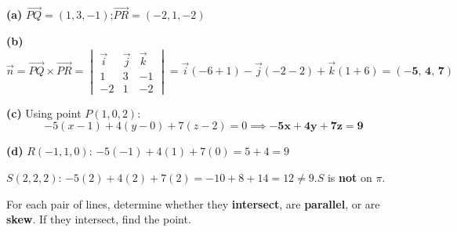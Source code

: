 \documentclass[addpoints]{exam}
\begin{document}
\begin{questions}
\begin{solution}[9cm]
\textbf{(a)} $\overrightarrow{PQ} = (1,3,-1)$;\quad $\overrightarrow{PR} = (-2,1,-2)$

\textbf{(b)}
\[
\vec{n} = \overrightarrow{PQ}\times\overrightarrow{PR} =
\begin{vmatrix}\vec{i}&\vec{j}&\vec{k}\\1&3&-1\\-2&1&-2\end{vmatrix}
= \vec{i}(-6+1) - \vec{j}(-2-2) + \vec{k}(1+6) = \mathbf{(-5,\,4,\,7)}
\]

\textbf{(c)} Using point $P(1,0,2)$:
\[
-5(x-1)+4(y-0)+7(z-2)=0 \implies \mathbf{-5x+4y+7z = 9}
\]

\textbf{(d)} $R(-1,1,0)$: $-5(-1)+4(1)+7(0) = 5+4 = 9$\checkmark

$S(2,2,2)$: $-5(2)+4(2)+7(2) = -10+8+14 = 12 \neq 9$.\quad $S$ is \textbf{not} on $\pi$.
\end{solution}

\question For each pair of lines, determine whether they \textbf{intersect}, are
\textbf{parallel}, or are \textbf{skew}. If they intersect, find the point.
\end{questions}
\end{document}
